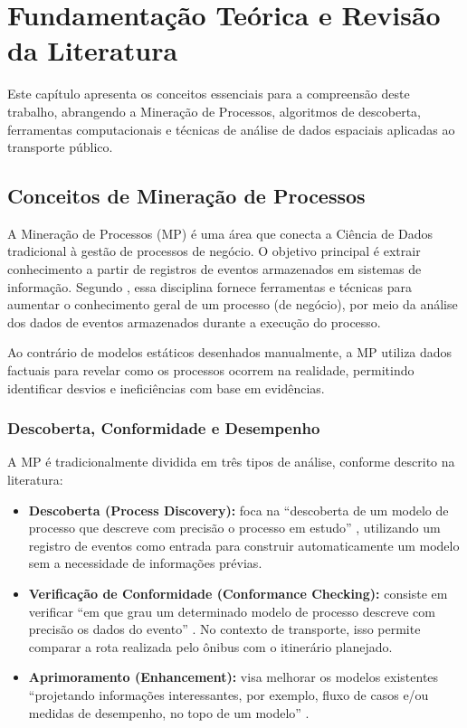 
\chapter{Fundamentação Teórica e Revisão da Literatura}\label{cap:fundamentacao}

Este capítulo apresenta os conceitos essenciais para a compreensão deste trabalho, abrangendo a Mineração de Processos, algoritmos de descoberta, ferramentas computacionais e técnicas de análise de dados espaciais aplicadas ao transporte público.

\section{Conceitos de Mineração de Processos}\label{sec:conceitosMP}

A Mineração de Processos (MP) é uma área que conecta a Ciência de Dados tradicional à gestão de processos de negócio. O objetivo principal é extrair conhecimento a partir de registros de eventos armazenados em sistemas de informação. Segundo , essa disciplina fornece ferramentas e técnicas para aumentar o conhecimento geral de um processo (de negócio), por meio da análise dos dados de eventos armazenados durante a execução do processo.

Ao contrário de modelos estáticos desenhados manualmente, a MP utiliza dados factuais para revelar como os processos ocorrem na realidade, permitindo identificar desvios e ineficiências com base em evidências.

\subsection{Descoberta, Conformidade e Desempenho}\label{subsec:tresPilaresMP}

A MP é tradicionalmente dividida em três tipos de análise, conforme descrito na literatura:

\begin{itemize}
  \item \textbf{Descoberta (Process Discovery):} foca na ``descoberta de um modelo de processo que descreve com precisão o processo em estudo'' \cite[p. 2]{berti2019}, utilizando um registro de eventos como entrada para construir automaticamente um modelo sem a necessidade de informações prévias.
  \item \textbf{Verificação de Conformidade (Conformance Checking):} consiste em verificar ``em que grau um determinado modelo de processo descreve com precisão os dados do evento'' \cite[p. 2]{berti2019}. No contexto de transporte, isso permite comparar a rota realizada pelo ônibus com o itinerário planejado.
  \item \textbf{Aprimoramento (Enhancement):} visa melhorar os modelos existentes ``projetando informações interessantes, por exemplo, fluxo de casos e/ou medidas de desempenho, no topo de um modelo'' \cite[p. 2]{berti2019}.
\end{itemize}

